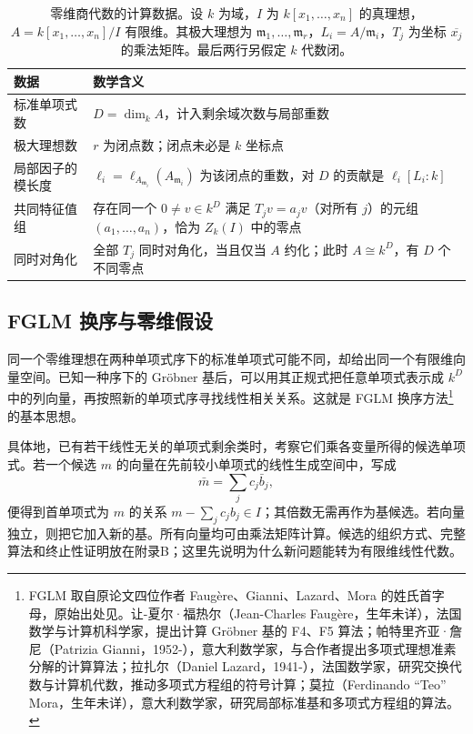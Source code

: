 \begin{table}[htbp]
	\centering
	\caption[零维商代数的计算数据]{零维商代数的计算数据。设 \(k\) 为域，\(I\) 为 \(k[x_1,\ldots,x_n]\) 的真理想，\(A=k[x_1,\ldots,x_n]/I\) 有限维。其极大理想为 \(\mathfrak m_1,\ldots,\mathfrak m_r\)，\(L_i=A/\mathfrak m_i\)，\(T_j\) 为坐标 \(\overline{x_j}\) 的乘法矩阵。最后两行另假定 \(k\) 代数闭。}
	\label{b3:tab:zero-dimensional-data}
	\begin{tabularx}{\textwidth}{@{}p{}>{\raggedright\arraybackslash}X@{}}
		\toprule
		数据 & 数学含义\\
		\midrule
		标准单项式数 & \(D=\dim_k A\)，计入剩余域次数与局部重数\\
		极大理想数 & \(r\) 为闭点数；闭点未必是 \(k\) 坐标点\\
		局部因子的模长度 & \(\ell_i=\ell_{A_{\mathfrak m_i}}(A_{\mathfrak m_i})\) 为该闭点的重数，对 \(D\) 的贡献是 \(\ell_i[L_i:k]\)\\
		共同特征值组 & 存在同一个 \(0\ne v\in k^D\) 满足 \(T_jv=a_jv\)（对所有 \(j\)）的元组 \((a_1,\ldots,a_n)\)，恰为 \(Z_k(I)\) 中的零点\\
		同时对角化 & 全部 \(T_j\) 同时对角化，当且仅当 \(A\) 约化；此时 \(A\cong k^D\)，有 \(D\) 个不同零点\\
		\bottomrule
	\end{tabularx}
\end{table}

\subsection{FGLM 换序与零维假设}
\label{b3:subsec:0805:03}

同一个零维理想在两种单项式序下的标准单项式可能不同，却给出同一个有限维向量空间。已知一种序下的 Gröbner 基后，可以用其正规式把任意单项式表示成 \(k^D\) 中的列向量，再按照新的单项式序寻找线性相关关系。这就是 FGLM 换序方法\footnote{FGLM 取自原论文四位作者 Faugère、Gianni、Lazard、Mora 的姓氏首字母，原始出处见\cite{FaugereGianniLazardMora1993FGLM}。让-夏尔·福热尔（Jean-Charles Faugère，生年未详），法国数学与计算机科学家，提出计算 Gröbner 基的 F4、F5 算法；帕特里齐亚·詹尼（Patrizia Gianni，1952-），意大利数学家，与合作者提出多项式理想准素分解的计算算法；拉扎尔（Daniel Lazard，1941-），法国数学家，研究交换代数与计算机代数，推动多项式方程组的符号计算；莫拉（Ferdinando “Teo” Mora，生年未详），意大利数学家，研究局部标准基和多项式方程组的算法。}的基本思想。

\ProseParagraphBreak
具体地，已有若干线性无关的单项式剩余类时，考察它们乘各变量所得的候选单项式。若一个候选 \(m\) 的向量在先前较小单项式的线性生成空间中，写成
\[
	\bar m=\sum_j c_j\bar b_j,
\]
便得到首单项式为 \(m\) 的关系 \(m-\sum_jc_jb_j\in I\)；其倍数无需再作为基候选。若向量独立，则把它加入新的基。所有向量均可由乘法矩阵计算。候选的组织方式、完整算法和终止性证明放在附录B；这里先说明为什么新问题能转为有限维线性代数。

